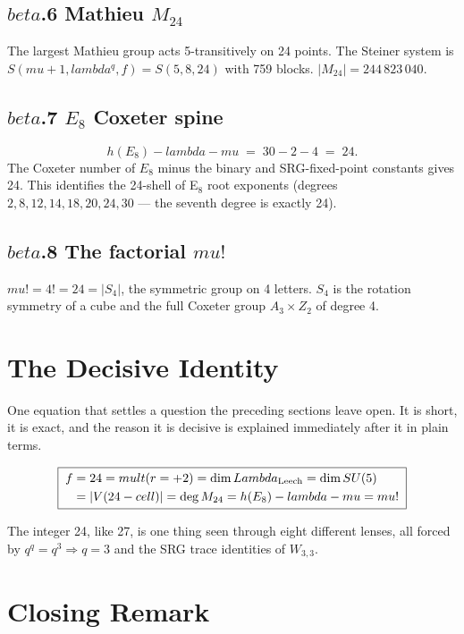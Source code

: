 \documentclass[12pt,a4paper]{article}
\def\mathbb#1{#1}%
\def\mathrm#1{#1}%
\def\text#1{#1}%
\def\beta{beta}%
\def\lambda{lambda}%
\def\Lambda{Lambda}%
\def\mu{mu}%
\theoremstyle{definition}
\newcommand{\SU}{\mathrm{SU}}
\newcommand{\ZZ}{\mathbb{Z}}
\begin{document}
\subsection*{$\beta$.6 \quad Mathieu $M_{24}$}
The largest Mathieu group acts 5-transitively on 24 points. The
Steiner system is $S(\mu+1, \lambda^q, f) = S(5,8,24)$ with 759
blocks. $|M_{24}| = 244\,823\,040$.

\subsection*{$\beta$.7 \quad $E_8$ Coxeter spine}
\[
h(E_8) - \lambda - \mu \;=\; 30 - 2 - 4 \;=\; 24.
\]
The Coxeter number of $E_8$ minus the binary and SRG-fixed-point
constants gives 24. This identifies the 24-shell of E$_8$ root
exponents (degrees $2, 8, 12, 14, 18, 20, 24, 30$ — the seventh degree
is exactly 24).

\subsection*{$\beta$.8 \quad The factorial $\mu!$}
$\mu! = 4! = 24 = |S_4|$, the symmetric group on 4 letters. $S_4$ is
the rotation symmetry of a cube and the full Coxeter group $A_3 \times
\ZZ_2$ of degree 4.

\section*{The Decisive Identity}

\begin{plainbox}
One equation that settles a question the preceding sections leave open. It is short,
it is exact, and the reason it is decisive is explained immediately after it in plain
terms.
\end{plainbox}


\[
\boxed{\;
\begin{aligned}
f &= 24 = \mathrm{mult}(r=+2) = \dim\Lambda_{\rm Leech} = \dim\SU(5) \\
  &= |V(24\text{-cell})| = \deg M_{24} = h(E_8)-\lambda-\mu = \mu!
\end{aligned}
\;}
\]

The integer 24, like 27, is one thing seen through eight different
lenses, all forced by $q^q = q^3 \Longrightarrow q=3$ and the SRG
trace identities of $W_{3,3}$.

\section*{Closing Remark}
\end{document}

